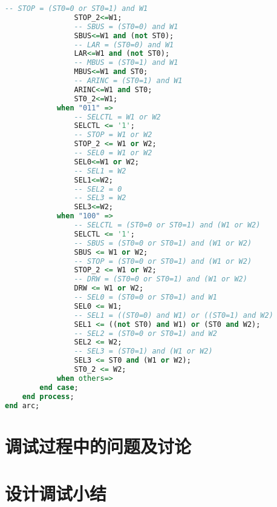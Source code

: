 \documentclass[UTF8]{ctexart}
\begin{document}
{\begin{lstlisting}[language={VHDL}]
				-- STOP = (ST0=0 or ST0=1) and W1
				STOP_2<=W1;
				-- SBUS = (ST0=0) and W1
				SBUS<=W1 and (not ST0);
				-- LAR = (ST0=0) and W1
				LAR<=W1 and (not ST0);
				-- MBUS = (ST0=1) and W1
				MBUS<=W1 and ST0;
				-- ARINC = (ST0=1) and W1
				ARINC<=W1 and ST0;
				ST0_2<=W1;
			when "011" =>
				-- SELCTL = W1 or W2
				SELCTL <= '1';
				-- STOP = W1 or W2
				STOP_2 <= W1 or W2;
				-- SEL0 = W1 or W2
				SEL0<=W1 or W2;
				-- SEL1 = W2
				SEL1<=W2;
				-- SEL2 = 0
				-- SEL3 = W2
				SEL3<=W2;
			when "100" =>
				-- SELCTL = (ST0=0 or ST0=1) and (W1 or W2)
				SELCTL <= '1';
				-- SBUS = (ST0=0 or ST0=1) and (W1 or W2)
				SBUS <= W1 or W2;
				-- STOP = (ST0=0 or ST0=1) and (W1 or W2)
				STOP_2 <= W1 or W2;
				-- DRW = (ST0=0 or ST0=1) and (W1 or W2)
				DRW <= W1 or W2;
				-- SEL0 = (ST0=0 or ST0=1) and W1
				SEL0 <= W1;
				-- SEL1 = ((ST0=0) and W1) or ((ST0=1) and W2)
				SEL1 <= ((not ST0) and W1) or (ST0 and W2);
				-- SEL2 = (ST0=0 or ST0=1) and W2
				SEL2 <= W2;
				-- SEL3 = (ST0=1) and (W1 or W2) 
				SEL3 <= ST0 and (W1 or W2);
				ST0_2 <= W2;
			when others=>
		end case;
	end process;
end arc;
\end{lstlisting}
}

\section{调试过程中的问题及讨论}

\section{设计调试小结}
\end{document}
